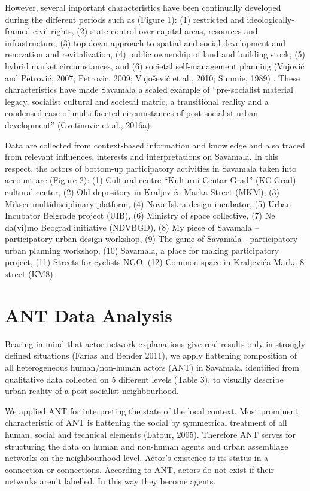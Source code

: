 \documentclass[11pt]{report}
\begin{document}
However, several important characteristics have been continually developed during the different periods such as (Figure 1): (1) restricted and ideologically-framed civil rights, (2) state control over capital areas, resources and infrastructure, (3) top-down approach to spatial and social development and renovation and revitalization, (4) public ownership of land and building stock, (5) hybrid market circumstances, and  (6) societal self-management planning (Vujović and Petrović, 2007; Petrovic, 2009; Vujošević et al., 2010; Simmie, 1989) . These characteristics have made Savamala a scaled example of “pre-socialist material legacy, socialist cultural and societal matric, a transitional reality and a condensed case of multi-faceted circumstances of post-socialist urban development” (Cvetinovic et al., 2016a).

Data are collected from context-based information and knowledge and also traced from relevant influences, interests and interpretations on Savamala.  In this respect, the actors of bottom-up participatory activities in Savamala taken into account are (Figure 2):  (1) Cultural centre “Kulturni Centar Grad” (KC Grad) cultural center, (2) Old depository in Kraljevića Marka Street (MKM), (3) Mikser multidisciplinary platform, (4) Nova Iskra design incubator, (5) Urban Incubator Belgrade project (UIB), (6) Ministry of space collective, (7) Ne da(vi)mo Beograd initiative (NDVBGD), (8) My piece of Savamala – participatory urban design workshop, (9) The game of Savamala - participatory urban planning workshop, (10) Savamala, a place for making participatory project, (11) Streets for cyclists NGO, (12) Common space in Kraljevića Marka 8 street (KM8).


\chapter{ANT Data Analysis}

Bearing in mind that actor-network explanations give real results only in strongly defined situations (Farías and Bender 2011), we apply flattening composition of all heterogeneous human/non-human actors (ANT)  in Savamala, identified from qualitative data collected on 5 different levels (Table 3), to visually describe urban reality of a post-socialist neighbourhood.

We applied ANT for  interpreting the state of the local context. Most prominent characteristic of ANT is flattening the social by symmetrical treatment of all human, social and technical elements (Latour, 2005). Therefore ANT serves for structuring the data on human and non-human agents and urban assemblage networks on the neighbourhood level. Actor’s existence is its status in a connection or connections. According to ANT, actors do not exist if their networks aren’t labelled. In this way they become agents.
\end{document}
